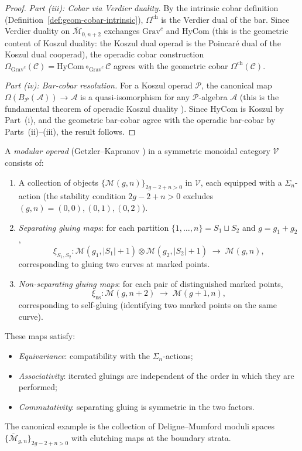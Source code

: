 \begin{proof}
\emph{Part (iii): Cobar via Verdier duality.}
By the intrinsic cobar definition
(Definition~\ref{def:geom-cobar-intrinsic}), $\Omega^{\mathrm{ch}}$
is the Verdier dual of the bar. Since Verdier duality on
$\overline{\mathcal{M}}_{0,n+2}$ exchanges $\mathrm{Grav}^c$ and
$\mathrm{HyCom}$ (this is the geometric content of Koszul duality:
the Koszul dual operad is the Poincaré dual of the Koszul dual
cooperad), the operadic cobar construction
$\Omega_{\mathrm{Grav}^c}(\mathcal{C}) = \mathrm{HyCom}
\circ_{\mathrm{Grav}^c} \mathcal{C}$ agrees with the
geometric cobar $\Omega^{\mathrm{ch}}(\mathcal{C})$.

\emph{Part (iv): Bar-cobar resolution.}
For a Koszul operad $\mathcal{P}$, the canonical map
$\Omega(B_{\mathcal{P}}(\mathcal{A})) \to \mathcal{A}$ is a
quasi-isomorphism for any $\mathcal{P}$-algebra $\mathcal{A}$ (this
is the fundamental theorem of operadic Koszul duality
\cite[Theorem~11.3.3]{LV12}). Since $\mathrm{HyCom}$ is Koszul
by Part~(i), and the geometric bar-cobar agree with the operadic
bar-cobar by Parts~(ii)--(iii), the result follows.
\end{proof}

\begin{definition}\label{def:modular-operad}
A \emph{modular operad} (Getzler--Kapranov \cite[\S5]{GeK98})
in a symmetric monoidal category $\mathcal{V}$ consists of:
\begin{enumerate}[label=(\roman*)]
\item A collection of objects
 $\{\mathcal{M}(g,n)\}_{2g-2+n>0}$ in $\mathcal{V}$,
 each equipped with a $\Sigma_n$-action (the stability condition
 $2g-2+n > 0$ excludes $(g,n) = (0,0), (0,1), (0,2)$).
\item \emph{Separating gluing maps}: for each partition
 $\{1, \ldots, n\} = S_1 \sqcup S_2$ and $g = g_1 + g_2$,
 \[
 \xi_{S_1, S_2}\colon \mathcal{M}(g_1, |S_1|+1)
 \otimes \mathcal{M}(g_2, |S_2|+1)
 \;\longrightarrow\; \mathcal{M}(g, n),
 \]
 corresponding to gluing two curves at marked points.
\item \emph{Non-separating gluing maps}: for each pair of
 distinguished marked points,
 \[
 \xi_{\mathrm{ns}}\colon \mathcal{M}(g, n+2)
 \;\longrightarrow\; \mathcal{M}(g+1, n),
 \]
 corresponding to self-gluing (identifying two marked points
 on the same curve).
\end{enumerate}
These maps satisfy:
\begin{itemize}
\item \emph{Equivariance}: compatibility with the $\Sigma_n$-actions;
\item \emph{Associativity}: iterated gluings are independent of
 the order in which they are performed;
\item \emph{Commutativity}: separating gluing is symmetric in
 the two factors.
\end{itemize}
The canonical example is the collection of Deligne--Mumford moduli
spaces $\{\overline{\mathcal{M}}_{g,n}\}_{2g-2+n>0}$ with clutching
maps at the boundary strata.
\end{definition}

